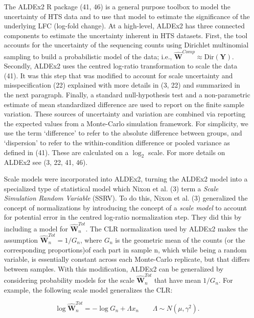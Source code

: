 \documentclass[
]{article}
\begin{document}
The ALDEx2 R package (41, 46) is a general purpose toolbox to model the
uncertainty of HTS data and to use that model to estimate the
significance of the underlying LFC (log-fold change). At a high-level,
ALDEx2 has three connected components to estimate the uncertainty
inherent in HTS datasets. First, the tool accounts for the uncertainty
of the sequencing counts using Dirichlet multinomial sampling to build a
probabilistic model of the data; i.e.,
\(\mathbf{\hat{W}}^{Comp} \approx \mathrm{Dir}(\mathbf{Y})\). Secondly,
ALDEx2 uses the centred log-ratio transformation to scale the data (41).
It was this step that was modified to account for scale uncertainty and
misspecification (22) explained with more details in (3, 22) and
summarized in the next paragraph. Finally, a standard null-hypothesis
test and a non-parametric estimate of mean standardized difference are
used to report on the finite sample variation. These sources of
uncertainty and variation are combined via reporting the expected values
from a Monte-Carlo simulation framework. For simplicity, we use the term
`difference' to refer to the absolute difference between groups, and
`dispersion' to refer to the within-condition difference or pooled
variance as defined in (41). These are calculated on a \(\log_2\) scale.
For more details on ALDEx2 see (3, 22, 41, 46).

Scale models were incorporated into ALDEx2, turning the ALDEx2 model
into a specialized type of statistical model which Nixon et al. (3) term
a \textit{Scale Simulation Random   Variable} (SSRV). To do this, Nixon
et al. (3) generalized the concept of normalizations by introducing the
concept of a \textit{scale model} to account for potential error in the
centred log-ratio normalization step. They did this by including a model
for \(\mathbf{\hat{W}}^{Tot}_{n}\). The CLR normalization used by ALDEx2
makes the assumption \(\mathbf{\hat{W}}^{Tot}_{n}=1/G_{n}\), where
\(G_n\) is the geometric mean of the counts (or the corresponding
proportions)of each part in sample n, which while being a random
variable, is essentially constant across each Monte-Carlo replicate, but
that differs between samples. With this modification, ALDEx2 can be
generalized by considering probability models for the scale
\(\mathbf{\hat{W}}^{Tot}_{n}\) that have mean \(1/G_{n}\). For example,
the following scale model generalizes the CLR:

\[\log \mathbf{\hat{W}}^{Tot}_{n} = -\log G_{n} + \Lambda x_{n} \qquad \Lambda \sim N(\mu, \gamma^{2}).\]
\end{document}
